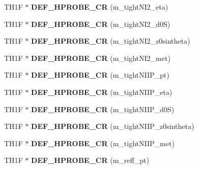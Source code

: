 \begin{DoxyCompactItemize}
\item 
\hypertarget{classHistos__Fake_a2b1bfd77c37397659ee7ff26628c91a3}{
TH1F $\ast$ {\bfseries DEF\_\-HPROBE\_\-CR} (m\_\-tightNI2\_\-eta)}
\label{classHistos__Fake_a2b1bfd77c37397659ee7ff26628c91a3}

\item 
\hypertarget{classHistos__Fake_a2b33a2531da512d1e7939e7bd170aa25}{
TH1F $\ast$ {\bfseries DEF\_\-HPROBE\_\-CR} (m\_\-tightNI2\_\-d0S)}
\label{classHistos__Fake_a2b33a2531da512d1e7939e7bd170aa25}

\item 
\hypertarget{classHistos__Fake_a4771b09284b814253563e9649c173451}{
TH1F $\ast$ {\bfseries DEF\_\-HPROBE\_\-CR} (m\_\-tightNI2\_\-z0sintheta)}
\label{classHistos__Fake_a4771b09284b814253563e9649c173451}

\item 
\hypertarget{classHistos__Fake_a114f68e447fb515659cf39dd7f61f1fe}{
TH1F $\ast$ {\bfseries DEF\_\-HPROBE\_\-CR} (m\_\-tightNI2\_\-met)}
\label{classHistos__Fake_a114f68e447fb515659cf39dd7f61f1fe}

\item 
\hypertarget{classHistos__Fake_a7a78eb638a9ad343484f18011e9bbe07}{
TH1F $\ast$ {\bfseries DEF\_\-HPROBE\_\-CR} (m\_\-tightNIIP\_\-pt)}
\label{classHistos__Fake_a7a78eb638a9ad343484f18011e9bbe07}

\item 
\hypertarget{classHistos__Fake_a59f974fdbffd39cf5d55de3bc05ddbb3}{
TH1F $\ast$ {\bfseries DEF\_\-HPROBE\_\-CR} (m\_\-tightNIIP\_\-eta)}
\label{classHistos__Fake_a59f974fdbffd39cf5d55de3bc05ddbb3}

\item 
\hypertarget{classHistos__Fake_a16360f34ed3541d98e588616bf9cdc92}{
TH1F $\ast$ {\bfseries DEF\_\-HPROBE\_\-CR} (m\_\-tightNIIP\_\-d0S)}
\label{classHistos__Fake_a16360f34ed3541d98e588616bf9cdc92}

\item 
\hypertarget{classHistos__Fake_aef071de7753a5ba6474b113cd2860e90}{
TH1F $\ast$ {\bfseries DEF\_\-HPROBE\_\-CR} (m\_\-tightNIIP\_\-z0sintheta)}
\label{classHistos__Fake_aef071de7753a5ba6474b113cd2860e90}

\item 
\hypertarget{classHistos__Fake_a6cdc60da13fc1796cc8212b6214c8b17}{
TH1F $\ast$ {\bfseries DEF\_\-HPROBE\_\-CR} (m\_\-tightNIIP\_\-met)}
\label{classHistos__Fake_a6cdc60da13fc1796cc8212b6214c8b17}

\item 
\hypertarget{classHistos__Fake_a5b923f672a81ef5cd38428f367579bf0}{
TH1F $\ast$ {\bfseries DEF\_\-HPROBE\_\-CR} (m\_\-reff\_\-pt)}
\label{classHistos__Fake_a5b923f672a81ef5cd38428f367579bf0}


\end{DoxyCompactItemize}
